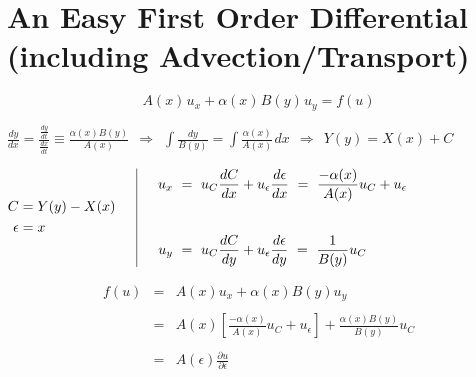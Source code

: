 \documentclass[12pt]{article}
\newcommand{\hs}{\hspace{1pt}}
\begin{document}
\section{An Easy First Order Differential {\small(including Advection/Transport)}}

\vspace{5pt}
\boldmath \[A(x)\hs u_x + \alpha(x)\hs B(y)\hs u_y = f(u)\] \unboldmath

\vspace{20pt}
\(\displaystyle 
	\frac{dy}{dx} = \frac{ \frac{dy}{dt} }{ \frac{dx}{dt} } \equiv \frac{\alpha(x) B(y)}{A(x)}\ 
	\ \Rightarrow\ 
	\ \int \frac{dy}{B(y)} = \int \frac{\alpha(x)}{A(x)}\hs dx \ \ \Rightarrow\ \ Y(y) = X(x) + C 
\)

\vspace{30pt} \noindent
\(
	\begin{aligned}
		C &= Y(y)-X(x) \\
		\epsilon &= x \\
	\end{aligned}
	\hspace{15pt} \vline \hspace{15pt}
	\begin{aligned}
		u_x &\ =\ u_C\displaystyle \frac{dC}{dx} 
			+ u_{\epsilon}\frac{d\epsilon}{dx}
			\ =\ \frac{-\alpha(x)}{A(x)} u_C 
			+ u_{\epsilon}
			\\[20pt]
		u_y &\ =\ u_C\displaystyle \frac{dC}{dy} 
			+ u_{\epsilon}\frac{d\epsilon}{dy}
			\ =\ \frac{1}{B(y)} u_C		
	\end{aligned}
\)

\vspace{20pt}
\begin{eqnarray*}
	f(u) &=& A(x) u_x + \alpha(x) B(y) u_y \\ \\
	&=& A(x) \left[ \frac{ -\alpha(x) }{ A(x) } u_C + u_{\epsilon} \right] 
		+ \frac{ \alpha(x) B(y) }{ B(y) } u_C 
		\\ \\
	&=& A(\epsilon) \frac{\partial u}{\partial \epsilon} \\ \\
\end{eqnarray*}
\end{document}
